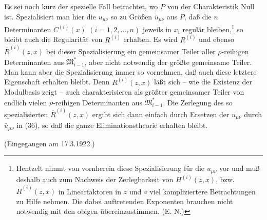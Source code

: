 \documentclass[11pt]{article}
\providecommand{\Mmod}{\mathfrak M}
\begin{document}
Es sei noch kurz der spezielle Fall betrachtet, wo $P$ von der Charakteristik Null ist. Spezialisiert man hier die $u_{\mu\nu}$ so zu Größen $\bar u_{\mu\nu}$ aus $P$, daß die $n$ Determinanten $C^{(i)}(x)$ $(i=1,2,\ldots,n)$ jeweils in $x_i$ regulär bleiben,\footnote{Hentzelt nimmt von vornherein diese Spezialisierung für die $u_{\mu\nu}$ vor und muß deshalb auch zum Nachweis der Zerlegbarkeit von $H^{(i)}(z,x)$, bzw. $\bar R^{(i)}(z,x)$ in Linearfaktoren in $z$ und $v$ viel kompliziertere Betrachtungen zu Hilfe nehmen. Die dabei auftretenden Exponenten brauchen nicht notwendig mit den obigen übereinzustimmen. (E. N.)} so bleibt auch die Regularität von $R^{(i)}$ erhalten. Es wird $R^{(i)}$ und ebenso $\bar R^{(i)}(z,x)$ bei dieser Spezialisierung ein gemeinsamer Teiler aller $\rho$-reihigen Determinanten aus $\Mmod^*_{i-1}$, aber nicht notwendig der größte gemeinsame Teiler. Man kann aber die Spezialisierung immer so vornehmen, daß auch diese letztere Eigenschaft erhalten bleibt. Denn $R^{(i)}(z,x)$ läßt sich -- wie die Existenz der Modulbasis zeigt -- auch charakterisieren als größter gemeinsamer Teiler von endlich vielen $\rho$-reihigen Determinanten aus $\Mmod^*_{i-1}$. Die Zerlegung des so spezialisierten $\bar R^{(i)}(z,x)$ ergibt sich dann einfach durch Ersetzen der $u_{\mu\nu}$ durch $\bar u_{\mu\nu}$ in (36), so daß die ganze Eliminationstheorie erhalten bleibt.

\begin{center}
(Eingegangen am 17.3.1922.)
\end{center}
\end{document}
